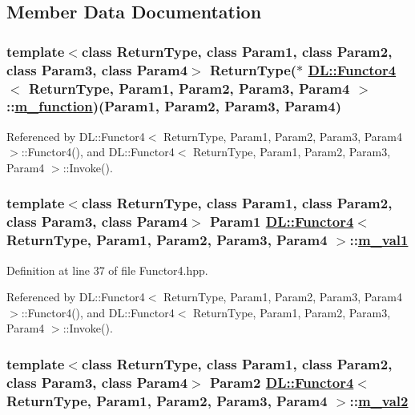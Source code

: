 \subsection{Member Data Documentation}
\hypertarget{classDL_1_1Functor4_r0}{
\subsubsection[m\_\-function]{\setlength{\rightskip}{0pt plus 5cm}template$<$class Return\-Type, class Param1, class Param2, class Param3, class Param4$>$ Return\-Type($\ast$ \hyperlink{classDL_1_1Functor4}{DL::Functor4}$<$ Return\-Type, Param1, Param2, Param3, Param4 $>$::\hyperlink{classDL_1_1Functor4_r0}{m\_\-function})(Param1, Param2, Param3, Param4)}}
\label{classDL_1_1Functor4_r0}




Referenced by DL::Functor4$<$ Return\-Type, Param1, Param2, Param3, Param4 $>$::Functor4(), and DL::Functor4$<$ Return\-Type, Param1, Param2, Param3, Param4 $>$::Invoke().\hypertarget{classDL_1_1Functor4_r1}{
\subsubsection[m\_\-val1]{\setlength{\rightskip}{0pt plus 5cm}template$<$class Return\-Type, class Param1, class Param2, class Param3, class Param4$>$ Param1 \hyperlink{classDL_1_1Functor4}{DL::Functor4}$<$ Return\-Type, Param1, Param2, Param3, Param4 $>$::\hyperlink{classDL_1_1Functor4_r1}{m\_\-val1}}}
\label{classDL_1_1Functor4_r1}




Definition at line 37 of file Functor4.hpp.

Referenced by DL::Functor4$<$ Return\-Type, Param1, Param2, Param3, Param4 $>$::Functor4(), and DL::Functor4$<$ Return\-Type, Param1, Param2, Param3, Param4 $>$::Invoke().\hypertarget{classDL_1_1Functor4_r2}{
\subsubsection[m\_\-val2]{\setlength{\rightskip}{0pt plus 5cm}template$<$class Return\-Type, class Param1, class Param2, class Param3, class Param4$>$ Param2 \hyperlink{classDL_1_1Functor4}{DL::Functor4}$<$ Return\-Type, Param1, Param2, Param3, Param4 $>$::\hyperlink{classDL_1_1Functor4_r2}{m\_\-val2}}}
\label{classDL_1_1Functor4_r2}




